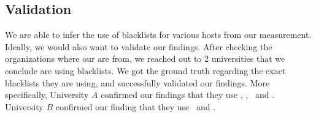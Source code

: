 

\subsection{Validation}

We are able to infer the use of blacklists for various hosts from our
measurement. Ideally, we would also want to validate our findings.
After checking the organizations where our {} are from, we
reached out to 2 universities that we conclude are using blacklists.
We got the ground truth regarding the exact blacklists they are using, and
successfully validated our findings. More specifically, University $A$
confirmed our findings that they use \bdsatif, \etcompromised,
\spamhausdrop\ and \spamhausedrop. University $B$ confirmed our finding that
they use \spamhausdrop\ and \spamhausedrop.

